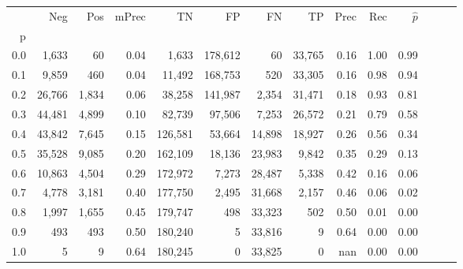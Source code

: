 \begin{tabular}{rrrrrrrrrrrrrr}
\toprule
{} &     Neg &    Pos & mPrec &       TN &       FP &      FN &      TP &  Prec &   Rec & $\hat{p}$ \\
p   &         &        &       &          &          &         &         &       &       &           \\
\midrule
0.0 &   1,633 &     60 &  0.04 &    1,633 &  178,612 &      60 &  33,765 &  0.16 &  1.00 &      0.99 \\
0.1 &   9,859 &    460 &  0.04 &   11,492 &  168,753 &     520 &  33,305 &  0.16 &  0.98 &      0.94 \\
0.2 &  26,766 &  1,834 &  0.06 &   38,258 &  141,987 &   2,354 &  31,471 &  0.18 &  0.93 &      0.81 \\
0.3 &  44,481 &  4,899 &  0.10 &   82,739 &   97,506 &   7,253 &  26,572 &  0.21 &  0.79 &      0.58 \\
0.4 &  43,842 &  7,645 &  0.15 &  126,581 &   53,664 &  14,898 &  18,927 &  0.26 &  0.56 &      0.34 \\
0.5 &  35,528 &  9,085 &  0.20 &  162,109 &   18,136 &  23,983 &   9,842 &  0.35 &  0.29 &      0.13 \\
0.6 &  10,863 &  4,504 &  0.29 &  172,972 &    7,273 &  28,487 &   5,338 &  0.42 &  0.16 &      0.06 \\
0.7 &   4,778 &  3,181 &  0.40 &  177,750 &    2,495 &  31,668 &   2,157 &  0.46 &  0.06 &      0.02 \\
0.8 &   1,997 &  1,655 &  0.45 &  179,747 &      498 &  33,323 &     502 &  0.50 &  0.01 &      0.00 \\
0.9 &     493 &    493 &  0.50 &  180,240 &        5 &  33,816 &       9 &  0.64 &  0.00 &      0.00 \\
1.0 &       5 &      9 &  0.64 &  180,245 &        0 &  33,825 &       0 &   nan &  0.00 &      0.00 \\
\bottomrule
\end{tabular}
